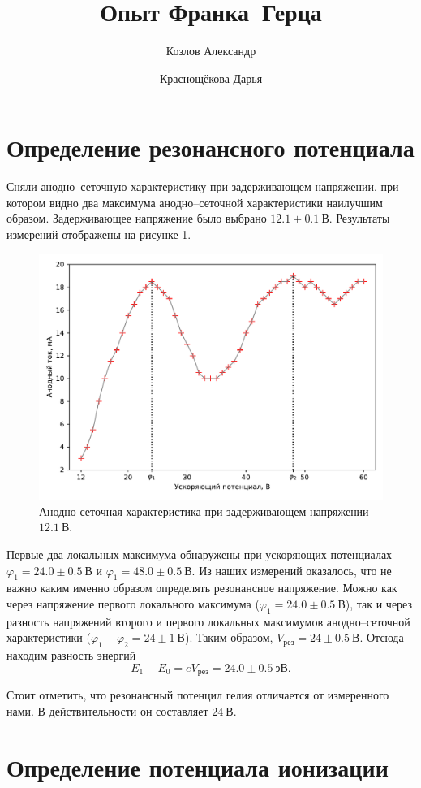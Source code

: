 \documentclass[12pt]{article}
\title{Опыт Франка\---Герца}
\author{Козлов Александр \and Краснощёкова Дарья}
\begin{document}
	\maketitle
	\section{Определение резонансного потенциала}
	Сняли анодно\---сеточную характеристику при задерживающем напряжении, при котором видно два максимума анодно\---сеточной характеристики наилучшим образом. Задерживающее напряжение было выбрано $12.1 \pm 0.1\ \text{В}$. Результаты измерений отображены на рисунке \ref{fig:figure1}.
	\begin{figure}[htbp]
		\centering
		\includegraphics[width=\linewidth]{../plots/1}
		\caption{Анодно-сеточная характеристика при задерживающем напряжении $12.1\ \text{В}$.}
		\label{fig:figure1}
	\end{figure}
	Первые два локальных максимума обнаружены при ускоряющих потенциалах $\varphi_1=24.0\pm0.5\ \text{В}$ и $\varphi_1=48.0\pm0.5\ \text{В}$. Из наших измерений оказалось, что не важно каким именно образом определять резонансное напряжение. Можно как через напряжение первого локального максимума ($\varphi_1=24.0\pm0.5\ \text{В}$), так и через разность напряжений второго и первого локальных максимумов анодно\---сеточной характеристики ($\varphi_1 - \varphi_2 = 24\pm1\ \text{В}$). Таким образом, $V_\text{рез} = 24\pm0.5\ \text{В}$. Отсюда находим разность энергий
	\begin{equation}
			E_1 - E_0 = eV_\text{рез} = 24.0\pm0.5\ \text{эВ}.
	\end{equation}
	\par Стоит отметить, что резонансный потенцил гелия отличается от измеренного нами. В действительности он составляет $24\ \text{В}$.

	\section{Определение потенциала ионизации}
	
\end{document}
